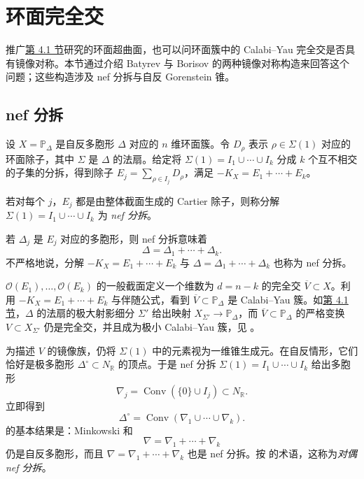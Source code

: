 \section{环面完全交}\label{sec:toric-complete-intersections}

推广\hyperref[sec:batyrev-mirror]{第 4.1 节}研究的环面超曲面，也可以问环面簇中的 Calabi--Yau 完全交是否具有镜像对称。本节通过介绍 Batyrev 与 Borisov  的两种镜像对称构造来回答这个问题；这些构造涉及 nef 分拆与自反 Gorenstein 锥。

\subsection{nef 分拆}\label{subsec:nef-partitions}

设 $X=\mathbb P_\Delta$ 是自反多胞形 $\Delta$ 对应的 $n$ 维环面簇。令 $D_\rho$ 表示 $\rho\in\Sigma(1)$ 对应的环面除子，其中 $\Sigma$ 是 $\Delta$ 的法扇。给定将 $\Sigma(1)=I_1\cup\cdots\cup I_k$ 分成 $k$ 个互不相交的子集的分拆，得到除子 $E_j=\sum_{\rho\in I_j}D_\rho$，满足 $-K_X=E_1+\cdots+E_k$。
\begin{definition}\label{def:nef-partition}
若对每个 $j$，$E_j$ 都是由整体截面生成的 Cartier 除子，则称分解 $\Sigma(1)=I_1\cup\cdots\cup I_k$ 为 \emph{nef 分拆}。
\end{definition}

若 $\Delta_j$ 是 $E_j$ 对应的多胞形，则 nef 分拆意味着
\[
\Delta=\Delta_1+\cdots+\Delta_k.
\]
不严格地说，分解 $-K_X=E_1+\cdots+E_k$ 与 $\Delta=\Delta_1+\cdots+\Delta_k$ 也称为 nef 分拆。

$\mathcal O(E_1),\ldots,\mathcal O(E_k)$ 的一般截面定义一个维数为 $d=n-k$ 的完全交 $\overline V\subset X$。利用 $-K_X=E_1+\cdots+E_k$ 与伴随公式，看到 $\overline V\subset\mathbb P_\Delta$ 是 Calabi--Yau 簇。如\hyperref[sec:batyrev-mirror]{第 4.1 节}，$\Delta$ 的法扇的极大射影细分 $\Sigma'$ 给出映射 $X_{\Sigma'}\to\mathbb P_\Delta$，而 $\overline V\subset\mathbb P_\Delta$ 的严格变换 $V\subset X_{\Sigma'}$ 仍是完全交，并且成为极小 Calabi--Yau 簇，见 。

为描述 $V$ 的镜像族，仍将 $\Sigma(1)$ 中的元素视为一维锥生成元。在自反情形，它们恰好是极多胞形 $\Delta^\circ\subset N_{\mathbb R}$ 的顶点。于是 nef 分拆 $\Sigma(1)=I_1\cup\cdots\cup I_k$ 给出多胞形
\[
\nabla_j=\operatorname{Conv}(\{0\}\cup I_j)\subset N_{\mathbb R}.
\]
立即得到
\[
\Delta^\circ=\operatorname{Conv}(\nabla_1\cup\cdots\cup\nabla_k).
\]
 的基本结果是：Minkowski 和
\[
\nabla=\nabla_1+\cdots+\nabla_k
\]
仍是自反多胞形，而且 $\nabla=\nabla_1+\cdots+\nabla_k$ 也是 nef 分拆。按  的术语，这称为\emph{对偶 nef 分拆}。

